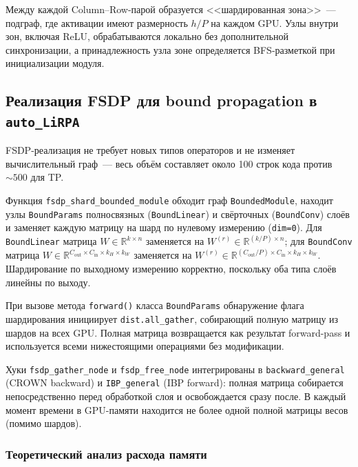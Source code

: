 Между каждой Column--Row-парой образуется <<шардированная зона>>~---
подграф, где активации имеют размерность $h/P$ на каждом GPU.
Узлы внутри зон, включая ReLU, обрабатываются локально без
дополнительной синхронизации, а принадлежность узла зоне определяется
BFS-разметкой при инициализации модуля.

\subsection{Реализация FSDP для bound propagation в \texttt{auto\_LiRPA}}

FSDP-реализация не требует новых типов операторов и не изменяет
вычислительный граф~--- весь объём составляет около 100 строк кода
против ${\sim}500$ для TP.

Функция \texttt{fsdp\_shard\_bounded\_module} обходит граф
\texttt{BoundedModule}, находит узлы \texttt{BoundParams}
полносвязных (\texttt{BoundLinear}) и свёрточных (\texttt{BoundConv})
слоёв и заменяет каждую матрицу на шард по нулевому измерению
(\texttt{dim=0}).
Для \texttt{BoundLinear} матрица $W \in \mathbb{R}^{k \times n}$
заменяется на $W^{(r)} \in \mathbb{R}^{(k/P) \times n}$;
для \texttt{BoundConv} матрица
$W \in \mathbb{R}^{C_\text{out} \times C_\text{in} \times k_H \times k_W}$
заменяется на $W^{(r)} \in \mathbb{R}^{(C_\text{out}/P) \times C_\text{in} \times k_H \times k_W}$.
Шардирование по выходному измерению корректно, поскольку оба типа
слоёв линейны по выходу.

При вызове метода \texttt{forward()} класса \texttt{BoundParams}
обнаружение флага шардирования инициирует \texttt{dist.all\_gather},
собирающий полную матрицу из шардов на всех GPU.
Полная матрица возвращается как результат forward-pass и используется
всеми нижестоящими операциями без модификации.

\begin{sloppypar}
Хуки \texttt{fsdp\_gather\_node} и \texttt{fsdp\_free\_node}
интегрированы в \texttt{backward\_general} (CROWN backward) и
\texttt{IBP\_general} (IBP forward): полная матрица собирается
непосредственно перед обработкой слоя и освобождается сразу после.
В каждый момент времени в GPU-памяти находится не более одной полной
матрицы весов (помимо шардов).
\end{sloppypar}

\subsubsection{Теоретический анализ расхода памяти}
\label{sec:fsdp-memory-theory}

